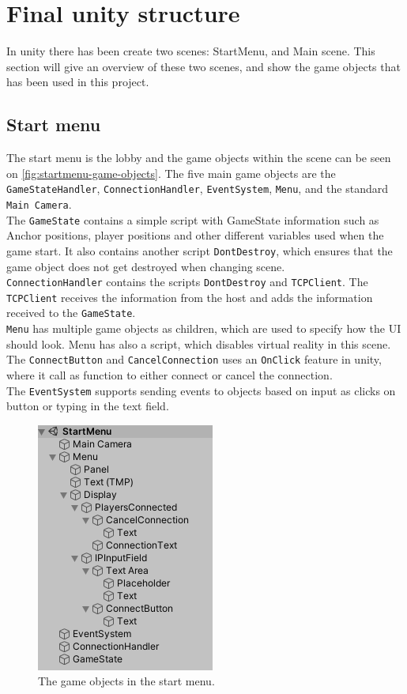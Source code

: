 \section{Final unity structure}
In unity there has been create two scenes: StartMenu, and Main scene.
This section will give an overview of these two scenes, and show the game objects that has been used in this project.

\subsection{Start menu}
The start menu is the lobby and the game objects within the scene can be seen on \autoref{fig:startmenu-game-objects}.
The five main game objects are the \texttt{GameStateHandler}, \texttt{ConnectionHandler}, \texttt{EventSystem}, \texttt{Menu}, and the standard \texttt{Main Camera}.
\\
The \texttt{GameState} contains a simple script with GameState information such as Anchor positions, player positions and other different variables used when the game start.
It also contains another script \texttt{DontDestroy}, which ensures that the game object does not get destroyed when changing scene.
\\
\texttt{ConnectionHandler} contains the scripts \texttt{DontDestroy} and \texttt{TCPClient}.
The \texttt{TCPClient} receives the information from the host and adds the information received to the \texttt{GameState}.
\\
\texttt{Menu} has multiple game objects as children, which are used to specify how the UI should look.
Menu has also a script, which disables virtual reality in this scene.
The \texttt{ConnectButton} and \texttt{CancelConnection} uses an \texttt{OnClick} feature in unity, where it call as function to either connect or cancel the connection.
\\
The \texttt{EventSystem} supports sending events to objects based on input as clicks on button or typing in the text field.

\begin{figure}[H]
    \centering
    \includegraphics[width=0.4\linewidth]{figures/startmenu.PNG}
    \caption{The game objects in the start menu.}
    \label{fig:startmenu-game-objects}
\end{figure}

